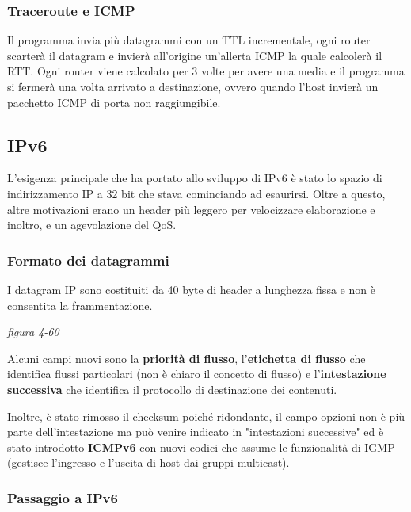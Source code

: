 \documentclass[
]{article}
\begin{document}
\hypertarget{header-n153}{%
\subsubsection{Traceroute e ICMP}\label{header-n153}}

Il programma invia più datagrammi con un TTL incrementale, ogni router
scarterà il datagram e invierà all'origine un'allerta ICMP la quale
calcolerà il RTT. Ogni router viene calcolato per 3 volte per avere una
media e il programma si fermerà una volta arrivato a destinazione,
ovvero quando l'host invierà un pacchetto ICMP di porta non
raggiungibile.

\hypertarget{header-n155}{%
\subsection{IPv6}\label{header-n155}}

L'esigenza principale che ha portato allo sviluppo di IPv6 è stato lo
spazio di indirizzamento IP a 32 bit che stava cominciando ad esaurirsi.
Oltre a questo, altre motivazioni erano un header più leggero per
velocizzare elaborazione e inoltro, e un agevolazione del QoS.

\hypertarget{header-n157}{%
\subsubsection{Formato dei datagrammi}\label{header-n157}}

I datagram IP sono costituiti da 40 byte di header a lunghezza fissa e
non è consentita la frammentazione.

\emph{figura 4-60}

Alcuni campi nuovi sono la \textbf{priorità di flusso},
l'\textbf{etichetta di flusso} che identifica flussi particolari (non è
chiaro il concetto di flusso) e l'\textbf{intestazione successiva} che
identifica il protocollo di destinazione dei contenuti.

Inoltre, è stato rimosso il checksum poiché ridondante, il campo opzioni
non è più parte dell'intestazione ma può venire indicato in
"intestazioni successive" ed è stato introdotto \textbf{ICMPv6} con
nuovi codici che assume le funzionalità di IGMP (gestisce l'ingresso e
l'uscita di host dai gruppi multicast).

\hypertarget{header-n162}{%
\subsubsection{Passaggio a IPv6}\label{header-n162}}
\end{document}
